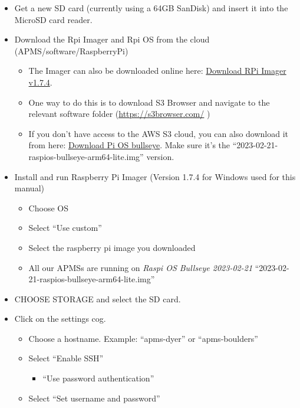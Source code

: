 \documentclass[
  letterpaper,
]{scrbook}
\providecommand{\tightlist}{%
  \setlength{\itemsep}{0pt}\setlength{\parskip}{0pt}}
\begin{document}
\begin{itemize}
\item
  Get a new SD card (currently using a 64GB SanDisk) and insert it into
  the MicroSD card reader.
\item
  Download the Rpi Imager and Rpi OS from the cloud
  (APMS/software/RaspberryPi)

  \begin{itemize}
  \tightlist
  \item
    The Imager can also be downloaded online here:
    \href{https://github.com/raspberrypi/rpi-imager/releases?page=3\#release-v1.7.4}{Download
    RPi Imager v1.7.4}.
  \item
    One way to do this is to download S3 Browser and navigate to the
    relevant software folder
    (\href{https://s3browser.com/}{\ul{https://s3browser.com/}} )
  \item
    If you don't have access to the AWS S3 cloud, you can also download
    it from here:
    \href{https://os.watch/raspberrypios/2023-02-21}{Download Pi OS
    bullseye}. Make sure it's the
    ``2023-02-21-raspios-bullseye-arm64-lite.img'' version.
  \end{itemize}
\item
  Install and run Raspberry Pi Imager (Version 1.7.4 for Windows used
  for this manual)

  \begin{itemize}
  \tightlist
  \item
    Choose OS\\
  \item
    Select ``Use custom''
  \item
    Select the raspberry pi image you downloaded
  \item
    All our APMSs are running on \emph{Raspi OS Bullseye 2023-02-21}
    ``2023-02-21-raspios-bullseye-arm64-lite.img''
  \end{itemize}
\item
  CHOOSE STORAGE and select the SD card.
\item
  Click on the settings cog.

  \begin{itemize}
  \item
    Choose a hostname. Example: ``apms-dyer'' or ``apms-boulders''
  \item
    Select ``Enable SSH''

    \begin{itemize}
    \tightlist
    \item
      ``Use password authentication''
    \end{itemize}
  \item
    Select ``Set username and password''


\end{itemize}
\end{itemize}
\end{document}
